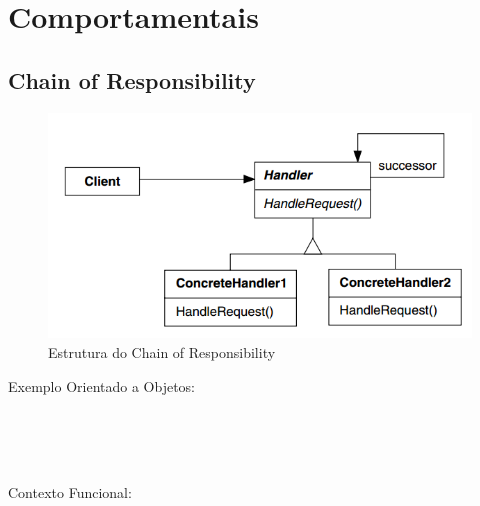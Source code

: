 \section{Comportamentais}

\subsection{Chain of Responsibility}

\begin{figure}[htb]
	\caption{\label{fig_grafico}Estrutura do Chain of Responsibility}
	\begin{center}
	    \includegraphics[scale=0.5]{5_padroes-contexto-funcional/5.3_comportamentais/5.3.01_chain-of-responsibility/diagram.png}
	\end{center}
\end{figure}

Exemplo Orientado a Objetos:

\begin{lstlisting}[caption={Chain of Responsibility Orientação a Objetos},label=oochresponsibility]


    
\end{lstlisting}

Contexto Funcional:


\begin{lstlisting}[caption={Chain of Responsibility Funcional},label=fpchresponsibility]
    

    
\end{lstlisting}
